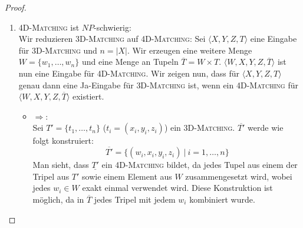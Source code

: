 \documentclass[a4paper]{scrartcl}
\begin{document}
\begin{enumerate}[label=\bfseries \arabic*]
\begin{enumerate}
\begin{proof}
\begin{enumerate}
            \item \textsc{4D-Matching} ist $NP$-schwierig: \\
                Wir reduzieren \textsc{3D-Matching} auf \textsc{4D-Matching}:
                Sei $\langle X,Y,Z,T \rangle$ eine Eingabe für
                \textsc{3D-Matching} und $n = |X|$.  Wir erzeugen eine weitere
                Menge $W = \{w_1, \dotsc, w_n\}$ und eine Menge an Tupeln
                $\overline{T} = W \times T$.  $\langle W,X,Y,Z,\overline{T}
                \rangle$ ist nun eine Eingabe für \textsc{4D-Matching}. Wir
                zeigen nun, dass für $\langle X,Y,Z,T \rangle$ genau dann eine
                Ja-Eingabe für \textsc{3D-Matching} ist, wenn ein
                \textsc{4D-Matching} für $\langle W,X,Y,Z,\overline{T} \rangle$
                existiert.
                \begin{itemize}
                    \item $\Rightarrow$: \\
                        Sei $T' = \{t_1, \dotsc, t_n\}$ ($t_i = (x_i, y_i,
                        z_i)$) ein \textsc{3D-Matching}.  $\overline{T'}$ werde
                        wie folgt konstruiert:
                        \begin{equation*}
                            \overline{T'} = \{ (w_i, x_i, y_i, z_i)\ |\ i = 1, \dotsc, n \}
                        \end{equation*}
                        Man sieht, dass $\underline{T'}$ ein
                        \textsc{4D-Matching} bildet, da jedes Tupel aus einem
                        der Tripel aus $T'$ sowie einem Element aus $W$
                        zusammengesetzt wird, wobei jedes $w_i \in W$ exakt
                        einmal verwendet wird.  Diese Konstruktion ist möglich,
                        da in $\overline{T}$ jedes Tripel mit jedem $w_i$
                        kombiniert wurde.


\end{itemize}
\end{enumerate}
\end{proof}
\end{enumerate}
\end{enumerate}
\end{document}
